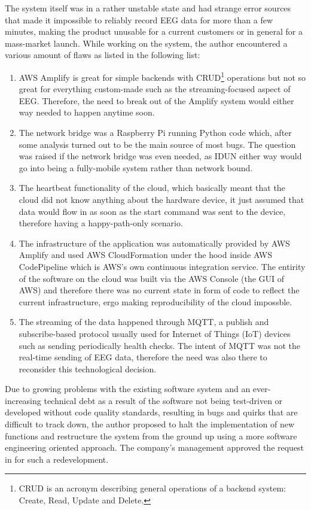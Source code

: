 The system itself was in a rather unstable state and had strange error sources that made it impossible to reliably record EEG data for more than a few minutes, making the product unusable for a current customers or in general for a mass-market launch. While working on the system, the author encountered a various amount of flaws as listed in the following list:

\begin{enumerate}
  \item AWS Amplify is great for simple backends with CRUD\footnote{CRUD is an acronym describing general operations of a backend system: Create, Read, Update and Delete.} operations but not so great for everything custom-made such as the streaming-focused aspect of EEG. Therefore, the need to break out of the Amplify system would either way needed to happen anytime soon.
  \item The network bridge was a Raspberry Pi running Python code which, after some analysis turned out to be the main source of most bugs. The question was raised if the network bridge was even needed, as IDUN either way would go into being a fully-mobile system rather than network bound.
  \item The heartbeat functionality of the cloud, which basically meant that the cloud did not know anything about the hardware device, it just assumed that data would flow in as soon as the start command was sent to the device, therefore having a happy-path-only scenario.
   \item The infrastructure of the application was automatically provided by AWS Amplify and used AWS CloudFormation under the hood inside AWS CodePipeline which is AWS's own continuous integration service. The entirity of the software on the cloud was built via the AWS Console (the GUI of AWS) and therefore there was no current state in form of code to reflect the current infrastructure, ergo making reproducibility of the cloud impossble.
   \item The streaming of the data happened through MQTT, a publish and subscribe-based protocol usually used for Internet of Things (IoT) devices such as sending periodically health checks. The intent of MQTT was not the real-time sending of EEG data, therefore the need was also there to reconsider this technological decision.
\end{enumerate}

Due to growing problems with the existing software system and an ever-increasing technical debt as a result of the software not being test-driven or developed without code quality standards, resulting in bugs and quirks that are difficult to track down, the author proposed to halt the implementation of new functions and restructure the system from the ground up using a more software engineering oriented approach. The company's management approved the request in for such a redevelopment.

